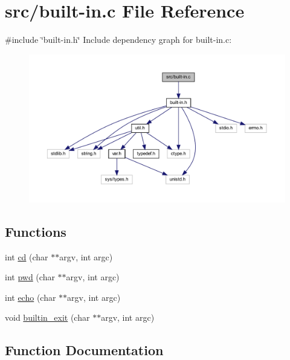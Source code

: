 \hypertarget{built-in_8c}{}\section{src/built-\/in.c File Reference}
\label{built-in_8c}
{\ttfamily \#include \char`\"{}built-\/in.\+h\char`\"{}}\newline
Include dependency graph for built-\/in.c\+:\nopagebreak
\begin{figure}[H]
\begin{center}
\leavevmode
\includegraphics[width=350pt]{built-in_8c__incl}
\end{center}
\end{figure}
\subsection*{Functions}
\begin{DoxyCompactItemize}
\item 
int \mbox{\hyperlink{built-in_8c_a6e03260ed7d8b2ac33c1116c55c2cec7}{cd}} (char $\ast$$\ast$argv, int argc)
\item 
int \mbox{\hyperlink{built-in_8c_a7f540865bf44effc4cd5f843a0d29388}{pwd}} (char $\ast$$\ast$argv, int argc)
\item 
int \mbox{\hyperlink{built-in_8c_ae985125913017d37bb75b1ab7b977950}{echo}} (char $\ast$$\ast$argv, int argc)
\item 
void \mbox{\hyperlink{built-in_8c_a203155f52ab90e655b8040e61130dbcc}{builtin\+\_\+exit}} (char $\ast$$\ast$argv, int argc)
\end{DoxyCompactItemize}


\subsection{Function Documentation}
\mbox{\label{built-in_8c_a203155f52ab90e655b8040e61130dbcc}} 
